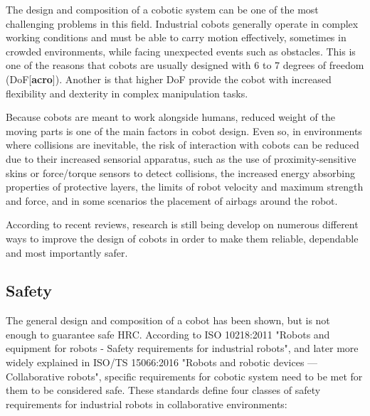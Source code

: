 \par The design and composition of a cobotic system can be one of the most challenging problems in this field. Industrial cobots generally operate in complex working conditions and must be able to carry motion effectively, sometimes in crowded environments, while facing unexpected events such as obstacles. This is one of the reasons that cobots are usually designed with 6 to 7 degrees of freedom (DoF[\textbf{acro}]). Another is that higher DoF provide the cobot with increased flexibility and dexterity in complex manipulation tasks.
\par Because cobots are meant to work alongside humans, reduced weight of the moving parts is one of the main factors in cobot design. Even so, in environments where collisions are inevitable, the risk of interaction with cobots can be reduced due to their increased sensorial apparatus, such as the use of proximity-sensitive skins or force/torque sensors to detect collisions, the increased energy absorbing properties of protective layers, the limits of robot velocity and maximum strength and force, and in some scenarios the placement of airbags around the robot.

\par According to recent reviews, research is still being develop on numerous different ways to improve the design of cobots in order to make them reliable, dependable and most importantly safer.



\subsection{Safety}


\par The general design and composition of a cobot has been shown, but is not enough to guarantee safe HRC. According to ISO 10218:2011 "Robots and equipment for robots - Safety requirements for industrial robots", and later more widely explained in ISO/TS 15066:2016 "Robots and robotic devices — Collaborative robots", specific requirements for cobotic system need to be met for them to be considered safe. These standards define four classes of safety requirements for industrial robots in collaborative environments:

